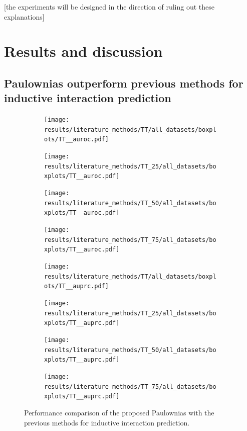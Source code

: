 \documentclass{article}
\begin{document}
[the experiments will be designed in the direction of ruling out these explanations]

\section{Results and discussion}

\subsection{Paulownias outperform previous methods for inductive interaction prediction}

\begin{figure}
    \centering
    \begin{subfigure}{.24\textwidth}
        \texttt{[image: results/literature\_methods/TT/all\_datasets/boxplots/TT\_\_auroc.pdf]}
    \end{subfigure}
    \begin{subfigure}{.24\textwidth}
        \texttt{[image: results/literature\_methods/TT\_25/all\_datasets/boxplots/TT\_\_auroc.pdf]}
    \end{subfigure}
    \begin{subfigure}{.24\textwidth}
        \texttt{[image: results/literature\_methods/TT\_50/all\_datasets/boxplots/TT\_\_auroc.pdf]}
    \end{subfigure}
    \begin{subfigure}{.24\textwidth}
        \texttt{[image: results/literature\_methods/TT\_75/all\_datasets/boxplots/TT\_\_auroc.pdf]}
    \end{subfigure}

     \begin{subfigure}{.24\textwidth}
        \texttt{[image: results/literature\_methods/TT/all\_datasets/boxplots/TT\_\_auprc.pdf]}
    \end{subfigure}
    \begin{subfigure}{.24\textwidth}
        \texttt{[image: results/literature\_methods/TT\_25/all\_datasets/boxplots/TT\_\_auprc.pdf]}
    \end{subfigure}
    \begin{subfigure}{.24\textwidth}
        \texttt{[image: results/literature\_methods/TT\_50/all\_datasets/boxplots/TT\_\_auprc.pdf]}
    \end{subfigure}
    \begin{subfigure}{.24\textwidth}
        \texttt{[image: results/literature\_methods/TT\_75/all\_datasets/boxplots/TT\_\_auprc.pdf]}
    \end{subfigure}   
    \caption{Performance comparison of the proposed Paulownias with the previous methods for inductive interaction prediction.}
    \label{fig:literature_TT}
\end{figure}
\end{document}

